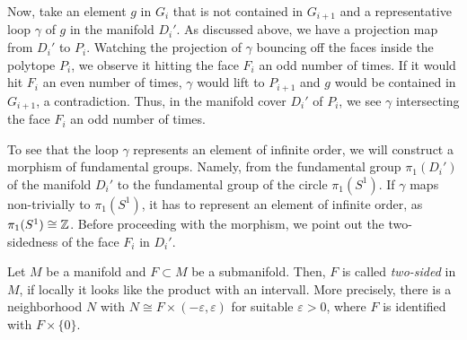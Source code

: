 Now, take an element \(g\) in \(G_i\) that is not contained in \(G_{i+1}\) and a representative loop \(\gamma\) of \(g\) in the manifold \(D_i'\).
As discussed above, we have a projection map from \(D_i'\) to \(P_i\).
Watching the projection of \(\gamma\) bouncing off the faces inside the polytope \(P_i\), we observe it hitting the face \(F_i\) an odd number of times.
If it would hit \(F_i\) an even number of times, \(\gamma\) would lift to \(P_{i+1}\) and \(g\) would be contained in \(G_{i+1}\), a contradiction.
Thus, in the manifold cover \(D_i'\) of \(P_i\), we see \(\gamma\) intersecting the face \(F_i\) an odd number of times.

To see that the loop \(\gamma\) represents an element of infinite order, we will construct a morphism of fundamental groups.
Namely, from the fundamental group \(\pi_1(D_i')\) of the manifold \(D_i'\) to the fundamental group of the circle \(\pi_1(S^1)\).
If \(\gamma\) maps non-trivially to \(\pi_1(S^1)\), it has to represent an element of infinite order, as \(\pi_1(S^1) \cong \mathbb{Z}\).
Before proceeding with the morphism, we point out the two-sidedness of the face \(F_i\) in \(D_i'\).

\begin{definition}
    Let \(M\) be a manifold and \(F \subset M\) be a submanifold.
    Then, \(F\) is called \emph{two-sided} in \(M\), if locally it looks like the product with an intervall.
    More precisely, there is a neighborhood \(N\) with \(N \cong F \times (-\varepsilon, \varepsilon)\) for suitable \(\varepsilon > 0\), where \(F\) is identified with \(F \times \{0\}\).
\end{definition}

